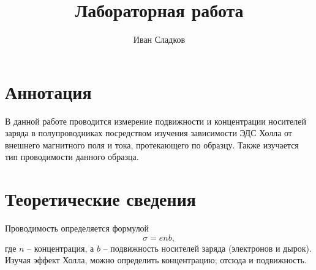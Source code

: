 \documentclass[a4paper]{article}
\title{Лабораторная работа \labnum \space \labname} %
\author{Иван Сладков}
\begin{document}
\maketitle
\thispagestyle{empty}
\section{Аннотация}
В данной работе проводится измерение подвижности и концентрации носителей заряда в полупроводниках посредством изучения зависимости ЭДС Холла от внешнего магнитного поля и тока, протекающего по образцу. Также изучается тип проводимости данного образца.

\section{Теоретические сведения}
Проводимость определяется формулой 
\begin{equation*}\label{проводимость}
	\sigma = e n b,
\end{equation*}
где $ n $ -- концентрация, а $ b $ -- подвижность носителей заряда (электронов и дырок).
Изучая эффект Холла, можно определить концентрацию; отсюда и подвижность.
\end{document}
